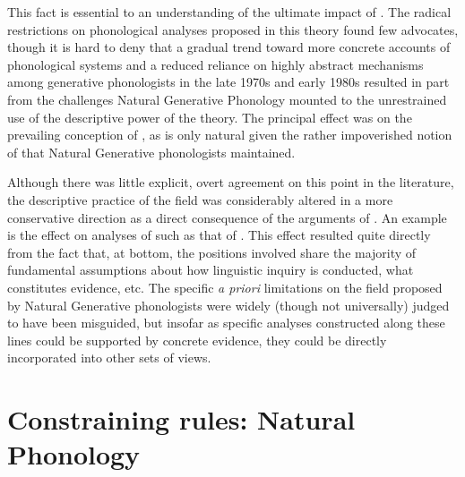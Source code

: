 This fact is essential to an understanding of the ultimate impact of
. The radical restrictions on phonological
analyses proposed in this theory found few advocates, though it is
hard to deny that a gradual trend toward more concrete accounts of
phonological systems and a reduced reliance on highly abstract
mechanisms among generative phonologists in the late 1970s and early
1980s resulted in part from the challenges Natural Generative
Phonology mounted to the unrestrained use of the descriptive power of
the \textsl{} theory. The principal effect was on the
prevailing conception of , as is only
natural given the rather impoverished notion of 
that Natural Generative phonologists maintained.

Although there was little explicit, overt agreement on this point in
the literature, the descriptive practice of the field was considerably
altered in a more conservative direction as a direct consequence of
the arguments of . An example is the
effect on analyses of  such as that of
\citet{tranel81:french}. This effect resulted quite directly from the
fact that, at bottom, the positions involved share the majority of
fundamental assumptions about how linguistic inquiry is conducted,
what constitutes evidence, etc. The specific \textit{a priori}
limitations on the field proposed by Natural Generative phonologists
were widely (though not universally) judged to have been misguided,
but insofar as specific analyses constructed along these lines could
be supported by concrete evidence, they could be directly incorporated
into other sets of views.

\section{Constraining rules: Natural Phonology}

